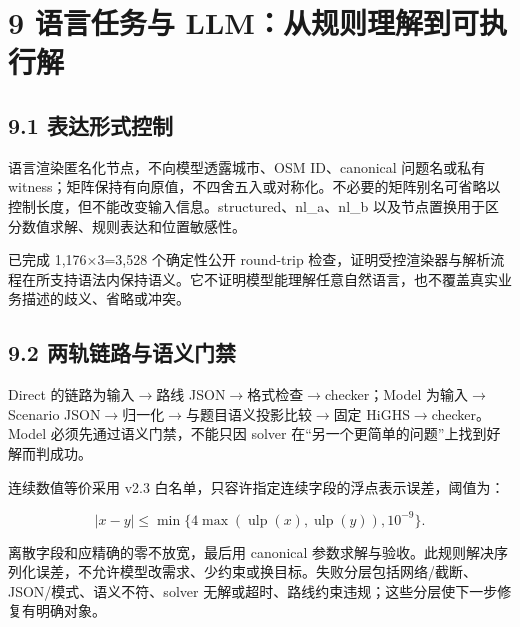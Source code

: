 \documentclass[UTF8,10pt,a4paper,fontset=fandol]{ctexart}
\begin{document}
\section*{9 语言任务与 LLM：从规则理解到可执行解}


\subsection*{9.1 表达形式控制}


语言渲染匿名化节点，不向模型透露城市、OSM ID、canonical 问题名或私有 witness；矩阵保持有向原值，不四舍五入或对称化。不必要的矩阵别名可省略以控制长度，但不能改变输入信息。structured、nl\_\allowbreak{}a、nl\_\allowbreak{}b 以及节点置换用于区分数值求解、规则表达和位置敏感性。


已完成 1,176\ensuremath{\times}3=3,528 个确定性公开 round-trip 检查，证明受控渲染器与解析流程在所支持语法内保持语义。它不证明模型能理解任意自然语言，也不覆盖真实业务描述的歧义、省略或冲突。


\subsection*{9.2 两轨链路与语义门禁}


Direct 的链路为输入\ensuremath{\rightarrow}路线 JSON\ensuremath{\rightarrow}格式检查\ensuremath{\rightarrow}checker；Model 为输入\ensuremath{\rightarrow}Scenario JSON\ensuremath{\rightarrow}归一化\ensuremath{\rightarrow}与题目语义投影比较\ensuremath{\rightarrow}固定 HiGHS\ensuremath{\rightarrow}checker。Model 必须先通过语义门禁，不能只因 solver 在“另一个更简单的问题”上找到好解而判成功。


连续数值等价采用 v2.3 白名单，只容许指定连续字段的浮点表示误差，阈值为：


\begin{equation}
|x-y|\le \min\{4\max(\operatorname{ulp}(x),\operatorname{ulp}(y)),10^{-9}\}.
\end{equation}

离散字段和应精确的零不放宽，最后用 canonical 参数求解与验收。此规则解决序列化误差，不允许模型改需求、少约束或换目标。失败分层包括网络/\allowbreak{}截断、JSON/\allowbreak{}模式、语义不符、solver 无解或超时、路线约束违规；这些分层使下一步修复有明确对象。
\end{document}
